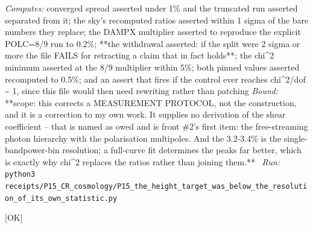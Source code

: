 \begin{description}
\emph{Computes:} converged spread asserted under 1\% and the truncated run asserted separated from it; the sky's recomputed ratios asserted within 1 sigma of the bare numbers they replace; the DAMPX multiplier asserted to reproduce the explicit POLC=8/9 run to 0.2\%; **the withdrawal asserted: if the split were 2 sigma or more the file FAILS for retracting a claim that in fact holds**; the chi\textasciicircum{}2 minimum asserted at the 8/9 multiplier within 5\%; both pinned values asserted recomputed to 0.5\%; and an assert that fires if the control ever reaches chi\textasciicircum{}2/dof \textasciitilde{} 1, since this file would then need rewriting rather than patching
 \emph{Bound:} **scope: this corrects a MEASUREMENT PROTOCOL, not the construction, and it is a correction to my own work. It supplies no derivation of the shear coefficient -- that is named as owed and is front \#2's first item: the free-streaming photon hierarchy with the polarisation multipoles. And the 3.2-3.4\% is the single-bandpower-bin resolution; a full-curve fit determines the peaks far better, which is exactly why chi\textasciicircum{}2 replaces the ratios rather than joining them.**
\ \emph{Run:} \texttt{python3 receipts/P15\_CR\_cosmology/P15\_the\_height\_target\_was\_below\_the\_resolution\_of\_its\_own\_statistic.py}
\item[\label{rcpt:P15_the_shear_coefficient_derived_not_remembered}\texttt{P15\_the\_shear\_coefficient\_derived\_not\_remembered}]\hfill\textsf{[OK]}\\

\end{description}
